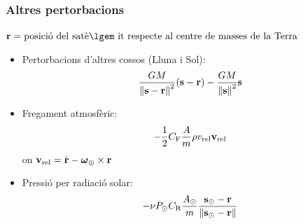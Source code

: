 \documentclass{beamer} %
\begin{document}
\begin{frame}
  \frametitle{Altres pertorbacions}
  $\vf{r} = \text{posició del satè\lgem it respecte al centre de masses de la Terra}$

  \vspace{0.25cm}
  \begin{itemize}
    \item<1-> Pertorbacions d'altres cossos (Lluna i Sol):
      $$\frac{GM}{\left\|\boldsymbol{\mathrm{s}}-\boldsymbol{\mathrm{r}}\right\|^2}(\boldsymbol{\mathrm{s}}-\boldsymbol{\mathrm{r}}) - \frac{GM}{\left\|\boldsymbol{\mathrm{s}}\right\|^2}\boldsymbol{\mathrm{s}}$$
    \item<2-> Fregament atmosfèric: $$-\frac{1}{2}C_\mathrm{F} \frac{A}{m}\rho v_\mathrm{rel}\boldsymbol{\mathrm{v}}_\mathrm{rel}$$
      on $\boldsymbol{\mathrm{v}}_\mathrm{rel}=\dot{\boldsymbol{\mathrm{r}}}-\boldsymbol{\mathrm{\omega}}_\oplus\times\boldsymbol{\mathrm{r}}$
    \item<3-> Pressió per radiació solar: $$
        -\nu P_\odot C_\mathrm{R} \frac{A_\odot}{m} \frac{\boldsymbol{\mathrm{s}}_\odot-\boldsymbol{\mathrm{r}}}{\left\|\boldsymbol{\mathrm{s}}_\odot-\boldsymbol{\mathrm{r}}\right\|}
      $$
  \end{itemize}
\end{frame}
\end{document}
